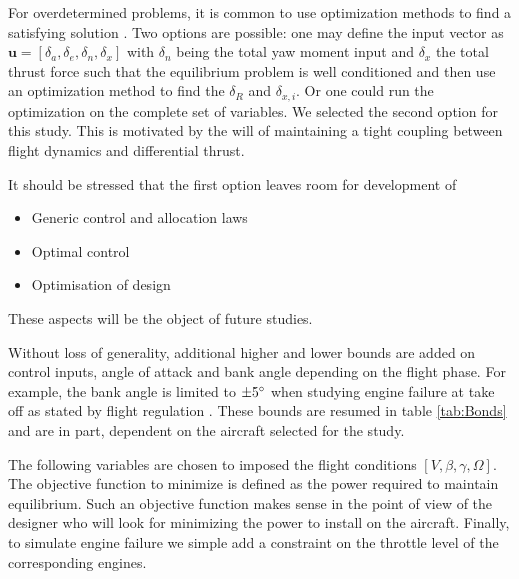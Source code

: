 For overdetermined problems, it is common to use optimization methods to find a satisfying solution \cite{OppeinheimerControlAllocation}. Two options are possible: one may define the input vector as $\mathbf{u}=[\delta_a,\delta_e,\delta_n, \delta_x]$ with $\delta_n$ being the total yaw moment input and $\delta_x$ the total thrust force such that the equilibrium problem is well conditioned and then use an optimization method to find the $\delta_R$ and $\delta_{x,i}$. Or one could run the optimization on the complete set of variables. We selected the second option for this study. This is motivated by the will of maintaining a tight coupling between flight dynamics and differential thrust.

It should be stressed that the first option leaves room for development of 
\begin{itemize}
	\item Generic control and allocation laws
	\item Optimal control
	\item Optimisation of design
\end{itemize}

These aspects will be the object of future studies.

Without loss of generality, additional higher and lower bounds are added on control inputs, angle of attack and bank angle depending on the flight phase. For example, the bank angle is limited to $\pm5\degree$ when studying engine failure at take off as stated by flight regulation \cite{CS25}. These bounds are resumed in table \ref{tab:Bonds} and are in part, dependent on the aircraft selected for the study.

The following variables are chosen to imposed the flight conditions $[V,\beta,\gamma,\Omega]$. The objective function to minimize is defined as the power required to maintain equilibrium. Such an objective function makes sense in the point of view of the designer who will look for minimizing the power to install on the aircraft. Finally, to simulate engine failure we simple add a constraint on the throttle level of the corresponding engines.


